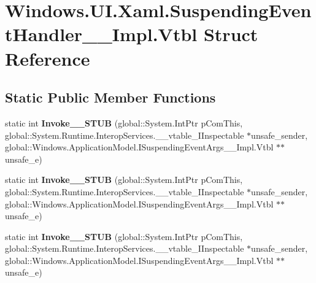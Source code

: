 \hypertarget{struct_windows_1_1_u_i_1_1_xaml_1_1_suspending_event_handler_____impl_1_1_vtbl}{}\section{Windows.\+U\+I.\+Xaml.\+Suspending\+Event\+Handler\+\_\+\+\_\+\+Impl.\+Vtbl Struct Reference}
\label{struct_windows_1_1_u_i_1_1_xaml_1_1_suspending_event_handler_____impl_1_1_vtbl}
\subsection*{Static Public Member Functions}
\begin{DoxyCompactItemize}
\item 
\mbox{\label{struct_windows_1_1_u_i_1_1_xaml_1_1_suspending_event_handler_____impl_1_1_vtbl_ae6c36c198aef833343f3bb31b8160ca9}} 
static int {\bfseries Invoke\+\_\+\+\_\+\+S\+T\+UB} (global\+::\+System.\+Int\+Ptr p\+Com\+This, global\+::\+System.\+Runtime.\+Interop\+Services.\+\_\+\+\_\+vtable\+\_\+\+I\+Inspectable $\ast$unsafe\+\_\+sender, global\+::\+Windows.\+Application\+Model.\+I\+Suspending\+Event\+Args\+\_\+\+\_\+\+Impl.\+Vtbl $\ast$$\ast$unsafe\+\_\+e)
\item 
\mbox{\label{struct_windows_1_1_u_i_1_1_xaml_1_1_suspending_event_handler_____impl_1_1_vtbl_ae6c36c198aef833343f3bb31b8160ca9}} 
static int {\bfseries Invoke\+\_\+\+\_\+\+S\+T\+UB} (global\+::\+System.\+Int\+Ptr p\+Com\+This, global\+::\+System.\+Runtime.\+Interop\+Services.\+\_\+\+\_\+vtable\+\_\+\+I\+Inspectable $\ast$unsafe\+\_\+sender, global\+::\+Windows.\+Application\+Model.\+I\+Suspending\+Event\+Args\+\_\+\+\_\+\+Impl.\+Vtbl $\ast$$\ast$unsafe\+\_\+e)
\item 
\mbox{\label{struct_windows_1_1_u_i_1_1_xaml_1_1_suspending_event_handler_____impl_1_1_vtbl_ae6c36c198aef833343f3bb31b8160ca9}} 
static int {\bfseries Invoke\+\_\+\+\_\+\+S\+T\+UB} (global\+::\+System.\+Int\+Ptr p\+Com\+This, global\+::\+System.\+Runtime.\+Interop\+Services.\+\_\+\+\_\+vtable\+\_\+\+I\+Inspectable $\ast$unsafe\+\_\+sender, global\+::\+Windows.\+Application\+Model.\+I\+Suspending\+Event\+Args\+\_\+\+\_\+\+Impl.\+Vtbl $\ast$$\ast$unsafe\+\_\+e)
$$
\end{DoxyCompactItemize}
